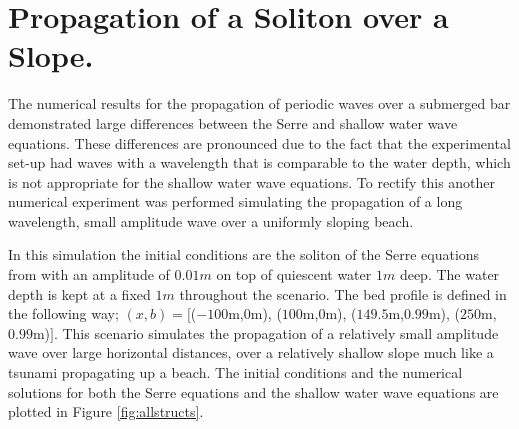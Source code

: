 \documentclass[a4paper,fleqn]{article} %
\begin{document}
	
\section{Propagation of a Soliton over a Slope.}
\label{Soliton up a Slope}
The numerical results for the propagation of periodic waves over a submerged bar demonstrated large differences between the Serre and shallow water wave equations. These differences are pronounced due to the fact that the experimental set-up had waves with a wavelength that is comparable to the water depth, which is not appropriate for the shallow water wave equations. To rectify this another numerical experiment was performed simulating the propagation of a long wavelength, small amplitude wave over a uniformly sloping beach.  

In this simulation the initial conditions are the soliton of the Serre equations from \cite{El-etal-2006} with an amplitude of $0.01m$ on top of quiescent water $1m$ deep. The water depth is kept at a fixed $1m$ throughout the scenario. The bed profile is defined in the following way; $(x,b) = [$($-100$m,$0$m), ($100$m,$0$m), ($149.5$m,$0.99$m), ($250$m,$0.99$m)$]$. This scenario simulates the propagation of a relatively small amplitude wave over large horizontal distances, over a relatively shallow slope much like a tsunami propagating up a beach. The initial conditions and the numerical solutions for both the Serre equations and the shallow water wave equations are plotted in Figure \ref{fig:allstructs}.
\end{document}

